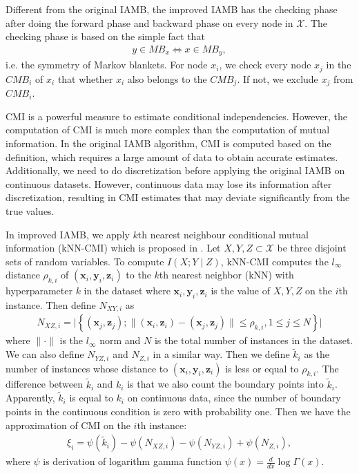 \documentclass[twoside,11pt]{article}
\begin{document}
Different from the original IAMB, the improved IAMB has the checking phase after doing the forward phase and backward phase on every node in $\mathcal X$. The checking phase is based on the simple fact that
\begin{align*}
    y\in MB_x \Longleftrightarrow x\in MB_y,
\end{align*}
i.e. the symmetry of Markov blankets. For node $x_i$, we check every node $x_j$ in the $CMB_i$ of $x_i$ that whether $x_i$ also belongs to the $CMB_j$. If not, we exclude $x_j$ from $CMB_i$. 

CMI is a powerful measure to estimate conditional independencies. However, the computation of CMI is much more complex than the computation of mutual information. In the original IAMB algorithm, CMI is computed based on the definition, which requires a large amount of data to obtain accurate estimates. Additionally, we need to do discretization before applying the original IAMB on continuous datasets. However, continuous data may lose its information after discretization, resulting in CMI estimates that may deviate significantly from the true values.

In improved IAMB, we apply $k$th nearest neighbour conditional mutual information (kNN-CMI)  which is proposed in \cite{mesner2020conditional}. Let $X, Y, Z\subset\mathcal X$ be three disjoint sets of random variables. To compute $I(X; Y\mid Z)$, kNN-CMI computes the $l_\infty$ distance $\rho_{k,i}$ of $(\mathbf x_i, \mathbf y_i, \mathbf z_i)$ to the $k$th nearest neighbor (kNN) with hyperparameter $k$ in the dataset where $\mathbf x_i, \mathbf y_i, \mathbf z_i$ is the value of $X, Y, Z$ on the $i$th instance. Then define $N_{XY,i}$ as 
\begin{align*}
    N_{XZ,i}=\bigg|\left\{(\mathbf x_j,\mathbf z_j); \parallel(\mathbf x_i,\mathbf z_i)- (\mathbf x_j, \mathbf z_j)\parallel\leq\rho_{k,i}, 1\leq j\leq N\right\}\bigg|
\end{align*}
where $\parallel\cdot\parallel$ is the $l_\infty$ norm and $N$ is the total number of instances in the dataset. We can also define $N_{YZ,i}$ and $N_{Z,i}$ in a similar way. Then we define $\tilde k_i$ as the number of instances whose distance to $(\mathbf x_i, \mathbf y_i, \mathbf z_i)$ is less or equal to $\rho_{k,i}$. The difference between $\tilde k_i$ and $k_i$ is that we also count the boundary points into $\tilde k_i$. Apparently, $\tilde k_i$ is equal to $k_i$ on continuous data, since the number of boundary points in the continuous condition is zero with probability one. Then we have the approximation of CMI on the $i$th instance:
\begin{align*}
    \xi_i=\psi(\tilde k_i)-\psi(N_{XZ,i})-\psi(N_{YZ,i})+\psi(N_{Z,i}),
\end{align*}
where $\psi$ is derivation of logarithm gamma function $\psi(x)=\frac{d}{dx}\log\Gamma(x)$.
\end{document}
